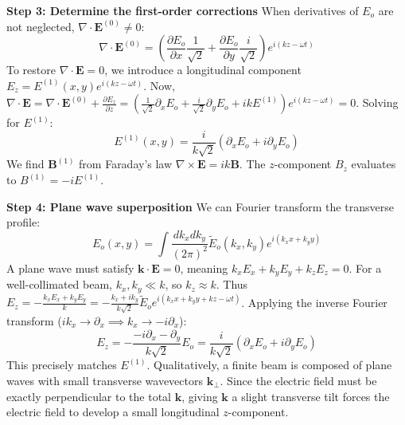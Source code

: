 \begin{solution}
\textbf{Step 3: Determine the first-order corrections}
When derivatives of $E_o$ are not neglected, $\nabla \cdot \mathbf{E}^{(0)} \neq 0$:
\[ \nabla \cdot \mathbf{E}^{(0)} = \left( \frac{\partial E_o}{\partial x} \frac{1}{\sqrt{2}} + \frac{\partial E_o}{\partial y} \frac{i}{\sqrt{2}} \right) e^{i(kz-\omega t)} \]
To restore $\nabla \cdot \mathbf{E} = 0$, we introduce a longitudinal component $E_z = E^{(1)}(x,y) e^{i(kz-\omega t)}$.
Now, $\nabla \cdot \mathbf{E} = \nabla \cdot \mathbf{E}^{(0)} + \frac{\partial E_z}{\partial z} = \left( \frac{1}{\sqrt{2}} \partial_x E_o + \frac{i}{\sqrt{2}} \partial_y E_o + i k E^{(1)} \right) e^{i(kz-\omega t)} = 0$.
Solving for $E^{(1)}$:
\[ E^{(1)}(x,y) = \frac{i}{k\sqrt{2}} (\partial_x E_o + i \partial_y E_o) \]
We find $\mathbf{B}^{(1)}$ from Faraday's law $\nabla \times \mathbf{E} = i k \mathbf{B}$. The $z$-component $B_z$ evaluates to $B^{(1)} = -i E^{(1)}$.

\textbf{Step 4: Plane wave superposition}
We can Fourier transform the transverse profile:
\[ E_o(x,y) = \int \frac{dk_x dk_y}{(2\pi)^2} \tilde{E}_o(k_x, k_y) e^{i(k_x x + k_y y)} \]
A plane wave must satisfy $\mathbf{k} \cdot \mathbf{E} = 0$, meaning $k_x E_x + k_y E_y + k_z E_z = 0$.
For a well-collimated beam, $k_x, k_y \ll k$, so $k_z \approx k$. Thus $E_z = -\frac{k_x E_x + k_y E_y}{k} = -\frac{k_x + i k_y}{k\sqrt{2}} \tilde{E}_o e^{i(k_x x + k_y y + k z - \omega t)}$.
Applying the inverse Fourier transform ($i k_x \to \partial_x \implies k_x \to -i \partial_x$):
\[ E_z = -\frac{-i \partial_x - \partial_y}{k\sqrt{2}} E_o = \frac{i}{k\sqrt{2}}(\partial_x E_o + i\partial_y E_o) \]
This precisely matches $E^{(1)}$. Qualitatively, a finite beam is composed of plane waves with small transverse wavevectors $\mathbf{k}_\perp$. Since the electric field must be exactly perpendicular to the total $\mathbf{k}$, giving $\mathbf{k}$ a slight transverse tilt forces the electric field to develop a small longitudinal $z$-component.


\end{solution}
